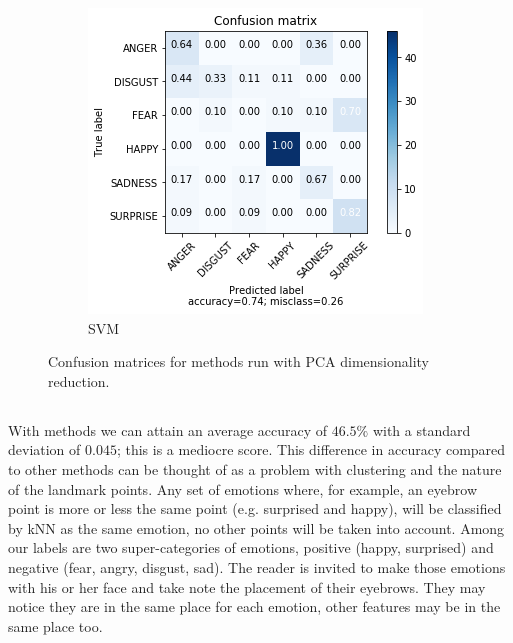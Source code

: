 \begin{figure}
    \begin{subfigure}[b]{0.22\textwidth}
        \includegraphics[width=\textwidth]{figures/pca-svm.png}
        \caption{SVM}
        \label{fig:pca-svm}
    \end{subfigure}
    \caption{Confusion matrices for methods run with PCA dimensionality reduction.}\label{fig:results}
\end{figure}

\subsection{\knn}

With \knn methods we can attain an average accuracy of $46.5\%$ with a standard deviation of $0.045$; this is a mediocre score. This difference in accuracy compared to other methods can be thought of as a problem with clustering and the nature of the landmark points. Any set of emotions where, for example, an eyebrow point is more or less the same point (e.g. surprised and happy), will be classified by kNN as the same emotion, no other points will be taken into account. Among our labels are two super-categories of emotions, positive (happy, surprised) and negative (fear, angry, disgust, sad). The reader is invited to make those emotions with his or her face and take note the placement of their eyebrows. They may notice they are in the same place for each emotion, other features may be in the same place too.

